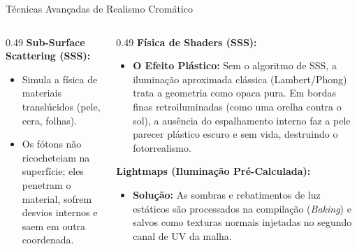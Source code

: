 \begin{frame}{Técnicas Avançadas de Realismo Cromático}
{\begin{columns}[T]
\begin{column}{0.49\textwidth}
                \textbf{Sub-Surface Scattering (SSS):}
                \begin{itemize}
                    \item Simula a física de materiais translúcidos (pele, cera, folhas).
                    \item Os fótons não ricocheteiam na superfície; eles penetram o material, sofrem desvios internos e saem em outra coordenada.
                \end{itemize}
            \end{column}

            \begin{column}{0.49\textwidth}    
                \scriptsize
                \textbf{Física de Shaders (SSS):}
                \begin{itemize}
                    \setlength{\itemsep}{1pt}
                    \item \textbf{O Efeito Plástico:} Sem o algoritmo de SSS, a iluminação aproximada clássica (Lambert/Phong) trata a geometria como opaca pura. Em bordas finas retroiluminadas (como uma orelha contra o sol), a ausência do espalhamento interno faz a pele parecer plástico escuro e sem vida, destruindo o fotorrealismo.
                \end{itemize}

                \textbf{Lightmaps (Iluminação Pré-Calculada):}
                \begin{itemize}
                    \item \textbf{Solução:} As sombras e rebatimentos de luz estáticos são processados na compilação (\textit{Baking}) e salvos como texturas normais injetadas no segundo canal de UV da malha.
                \end{itemize}
            \end{column}
        \end{columns}   
    }

\end{frame}





